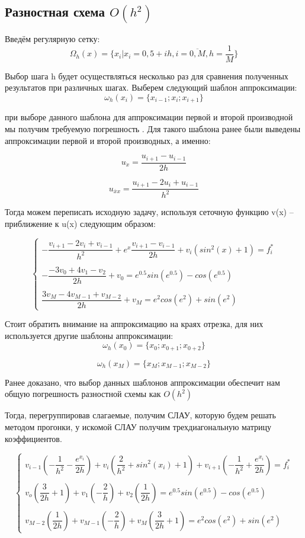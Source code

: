 \documentclass[12pt]{article}
\begin{document}
\subsection{Разностная схема $O(h^2)$}
Введём регулярную сетку:
$$
\Omega_h(x) = \{x_i | x_i = 0,5 + ih, i = \overline{0, M}, h = \dfrac{1}{M}\}
$$

Выбор шага h будет осуществляться несколько раз для сравнения полученных результатов при различных шагах.
Выберем следующий шаблон аппроксимации:
$$
\omega_h(x_i) = \{ x_{i-1}; x_i; x_{i + 1}\}
$$

при выборе данного шаблона для аппроксимации первой и второй производной  мы получим требуемую погрешность . Для такого шаблона ранее были выведены аппроксимации первой и второй производных, а именно:

$$
u_{\dot{x}} = \dfrac{u_{i + 1} - u_{i - 1}}{2h}
$$

$$
u_{\overline{x}x} = \dfrac{u_{i + 1} -2u_i+ u_{i - 1}}{h^2}
$$

Тогда можем переписать исходную задачу, используя сеточную функцию v(x) – приближение к u(x) следующим образом:

$$
\begin{cases}
-\dfrac{v_{i+1} - 2v_i + v_{i-1}}{h^2} + e^x\dfrac{v_{i+1} - v_{i-1}}{2h} + v_i(sin^2(x) + 1) = f_i^* \\
\\
- \dfrac{-3v_0 + 4v_1 - v_2}{2h} + v_0 = e^{0.5}sin(e^{0.5}) - cos(e^{0.5}) \\
\\
\dfrac{3v_M - 4v_{M-1} + v_{M-2}}{2h} + v_M = e^2cos(e^2) + sin(e^2)
\end{cases}
$$

Стоит обратить внимание на аппроксимацию на краях отрезка, для них используется другие шаблоны аппроксимации:
$$
\omega_h(x_0) = \{ x_{0}; x_{0 + 1}; x_{0 + 2}\}
$$

$$
\omega_h(x_M) = \{ x_M; x_{M - 1}; x_{M - 2}\}
$$

Ранее доказано, что выбор данных шаблонов аппроксимации обеспечит нам общую погрешность разностной схемы как 
$O(h^2)$

Тогда, перегруппировав слагаемые, получим СЛАУ, которую будем решать методом прогонки, у искомой СЛАУ получим трехдиагональную матрицу коэффициентов.

$$
\begin{cases}
v_{i-1}(-\dfrac{1}{h^2} - \dfrac{e^{x_i}}{2h}) + v_i(\dfrac{2}{h^2} + sin^2(x_i) + 1) + v_{i + 1}(-\dfrac{1}{h^2} + \dfrac{e^{x_i}}{2h}) = f_i^*\\
\\
v_o(\dfrac{3}{2h}  +1) + v_1(-\dfrac{2}{h}) + v_2(\dfrac{1}{2h}) = e^{0.5}sin(e^{0.5}) - cos(e^{0.5})\\
\\
v_{M-2}(\dfrac{1}{2h}) + v_{M-1}(-\dfrac{2}{h})  +v_M(\dfrac{3}{2h} + 1) = e^2cos(e^2) + sin(e^2)
\end{cases}
$$
\end{document}
